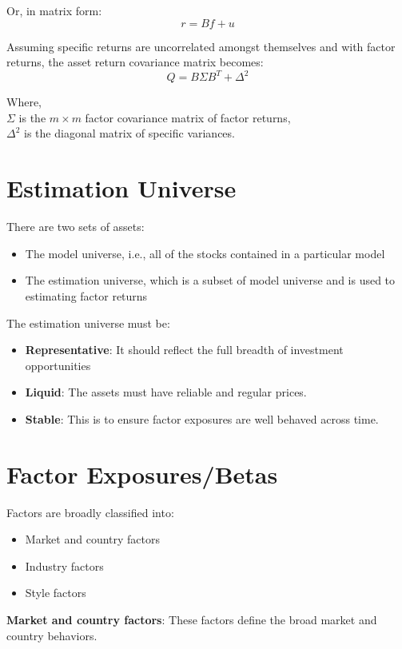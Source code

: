 \documentclass{article}
\begin{document}
Or, in matrix form:
\begin{equation}
r = B f + u
\end{equation}

Assuming specific returns are uncorrelated amongst themselves and with factor returns, the asset return covariance matrix becomes:
\begin{equation}
Q = B \Sigma B^T + \Delta^2
\end{equation}

Where, \\
\( \Sigma \) is the \( m \times m \) factor covariance matrix of factor returns, \\
\( \Delta^2 \) is the diagonal matrix of specific variances.

\section*{Estimation Universe}
There are two sets of assets:
\begin{itemize}
    \item The model universe, i.e., all of the stocks contained in a particular model
    \item The estimation universe, which is a subset of model universe and is used to estimating factor returns
\end{itemize}

The estimation universe must be:
\begin{itemize}
    \item \textbf{Representative}: It should reflect the full breadth of investment opportunities
    \item \textbf{Liquid}: The assets must have reliable and regular prices.
    \item \textbf{Stable}: This is to ensure factor exposures are well behaved across time.
\end{itemize}

\section*{Factor Exposures/Betas}
Factors are broadly classified into:
\begin{itemize}
    \item Market and country factors
    \item Industry factors
    \item Style factors
\end{itemize}

\textbf{Market and country factors}: These factors define the broad market and country behaviors.
\end{document}
